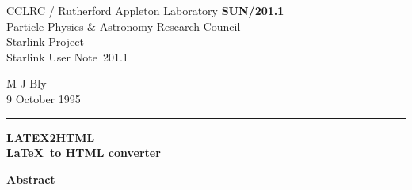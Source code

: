 \documentclass[twoside,11pt]{article}
\newcommand{\stardoccategory}  {Starlink User Note}
\newcommand{\stardocinitials}  {SUN}
\newcommand{\stardocnumber}    {201.1}
\newcommand{\stardocauthors}   {M J Bly}
\newcommand{\stardocdate}      {9 October 1995}
\newcommand{\stardoctitle}     {LATEX2HTML\\[1ex]
                                \LaTeX\ to HTML converter}
\newcommand{\stardocname}{\stardocinitials /\stardocnumber}
\newenvironment{latexonly}{}{}
\begin{document}
\thispagestyle{empty}

\begin{latexonly}
   CCLRC / {\sc Rutherford Appleton Laboratory} \hfill {\bf \stardocname}\\
   {\large Particle Physics \& Astronomy Research Council}\\
   {\large Starlink Project\\}
   {\large \stardoccategory\ \stardocnumber}
   \begin{flushright}
   \stardocauthors\\
   \stardocdate
   \end{flushright}
   \vspace{-4mm}
   \rule{\textwidth}{0.5mm}
   \vspace{5mm}
   \begin{center}
   {\Huge\bf  \stardoctitle \\ [2.5ex]}
   \end{center}
   \vspace{5mm}

   \vspace{10mm}
   \begin{center}
      {\Large\bf Abstract}
   \end{center}
\end{latexonly}
\end{document}
